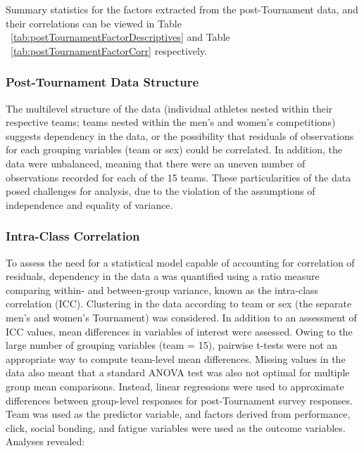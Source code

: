 Summary statistics for the factors extracted from the post-Tournament data, and their correlations can be viewed in Table ~\ref{tab:postTournamentFactorDescriptives} and Table ~\ref{tab:postTournamentFactorCorr} respectively.

\newpage
{} %
\begin{landscape}






\clearpage




\clearpage




\end{landscape}
\restoregeometry





\subsubsection{Post-Tournament Data Structure}
The multilevel structure of the data (individual athletes nested within their respective teams; teams nested within the men’s and women’s competitions) suggests dependency in the data, or the possibility that residuals of observations for each grouping variables (team or sex) could be correlated. In addition, the data were unbalanced, meaning that there were an uneven number of observations recorded for each of the 15 teams. These particularities of the data posed challenges for analysis, due to the violation of the assumptions of independence and equality of variance.

\subsubsection{Intra-Class Correlation}
To assess the need for a statistical model capable of accounting for correlation of residuals, dependency in the data a was quantified using a ratio measure comparing within- and between-group variance, known as the intra-class correlation (ICC). Clustering in the data according to team or sex (the separate men's and women's Tournament) was considered.  In addition to an assessment of ICC values, mean differences in variables of interest were assessed. Owing to the large number of grouping variables (team = 15), pairwise t-tests were not an appropriate way to compute team-level mean differences. Missing values in the data also meant that a standard ANOVA test was also not optimal for multiple group mean comparisons.  Instead, linear regressions were used to approximate differences between group-level responses for post-Tournament survey responses.  Team was used as the predictor variable, and factors derived from performance, click, social bonding, and fatigue variables were used as the outcome variables.  Analyses revealed:

